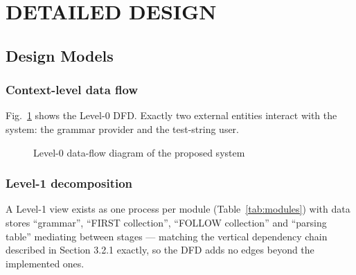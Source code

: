 \documentclass[12pt,a4paper,oneside,openany]{report}
\begin{document}
\section{DETAILED DESIGN}
\subsection{Design Models}
\subsubsection*{Context-level data flow}
Fig.~\ref{fig:dfd0} shows the Level-0 DFD. Exactly two external entities
interact with the system: the grammar provider and the test-string user.

\begin{figure}[h]
  \centering
  \caption{Level-0 data-flow diagram of the proposed system}
  \label{fig:dfd0}
\end{figure}

\subsubsection*{Level-1 decomposition}
A Level-1 view exists as one process per module (Table~\ref{tab:modules})
with data stores ``grammar'', ``FIRST collection'', ``FOLLOW collection''
and ``parsing table'' mediating between stages --- matching the vertical
dependency chain described in Section 3.2.1 exactly, so the DFD adds no
edges beyond the implemented ones.
\end{document}
